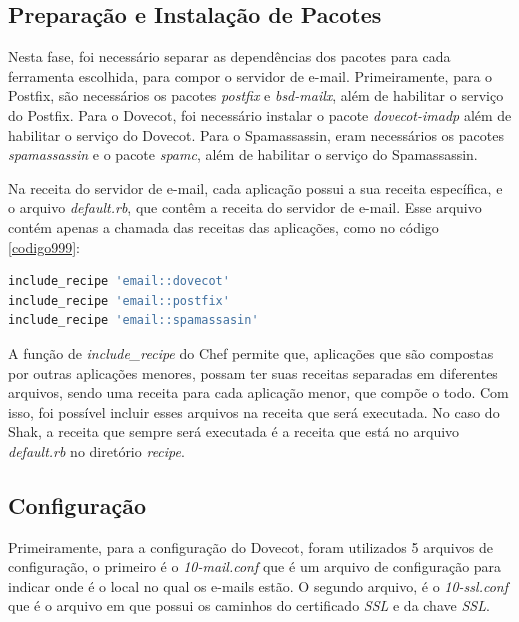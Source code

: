 \subsection{Preparação e Instalação de Pacotes }

Nesta fase, foi necessário separar as dependências dos pacotes para cada ferramenta
escolhida, para compor o servidor de e-mail. Primeiramente, para o Postfix, são necessários
os pacotes \textit{postfix} e \textit{bsd-mailx}, além de habilitar o serviço do 
Postfix. Para o Dovecot,
foi necessário instalar o pacote \textit{dovecot-imadp} além de habilitar o serviço do Dovecot. 
Para o Spamassassin, eram necessários os pacotes \textit{spamassassin} e o pacote
 \textit{spamc}, além de habilitar o serviço do Spamassassin.

Na receita do servidor de e-mail, cada aplicação possui a sua receita específica,
e o arquivo \textit{default.rb}, que contêm a receita do servidor de e-mail. Esse arquivo
contém apenas a chamada das receitas das aplicações, como no código \ref{codigo999}:

\begin{lstlisting}[language=Ruby,label=dice_index,caption={Exemplo da receita de email
composta pelas receitas das outras aplicações}, label=codigo999]
include_recipe 'email::dovecot'
include_recipe 'email::postfix'
include_recipe 'email::spamassasin'
\end{lstlisting}

A função de \textit{include\_recipe} do Chef permite que, aplicações que são compostas
por outras aplicações menores, possam ter suas receitas separadas em diferentes arquivos,
sendo uma receita para cada aplicação menor, que compõe o todo. Com isso, foi possível 
incluir esses arquivos na receita que será executada. No caso do Shak, a receita
que sempre será executada é a receita que está no arquivo \textit{default.rb} no diretório \textit{recipe}.

\subsection{Configuração}

Primeiramente, para a configuração do Dovecot, foram utilizados 5 arquivos
de configuração, o primeiro é o \textit{10-mail.conf} que é um arquivo de configuração para
indicar onde é o local no qual os e-mails estão. O segundo arquivo, é o \textit{10-ssl.conf}
que é o arquivo em que possui os caminhos do certificado \textit{SSL} e da chave \textit{SSL}.

